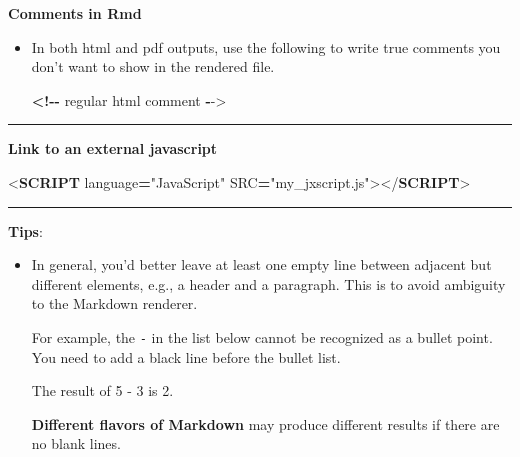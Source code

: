 \documentclass[
  a4paper,
  twoside,
  openright]{book}
\newenvironment{Shaded}{\begin{snugshade}}{\end{snugshade}}
\newcommand{\DataTypeTok}[1]{\textcolor[rgb]{0.13,0.29,0.53}{#1}}
\newcommand{\KeywordTok}[1]{\textcolor[rgb]{0.13,0.29,0.53}{\textbf{#1}}}
\newcommand{\NormalTok}[1]{#1}
\newcommand{\OperatorTok}[1]{\textcolor[rgb]{0.81,0.36,0.00}{\textbf{#1}}}
\newcommand{\OtherTok}[1]{\textcolor[rgb]{0.56,0.35,0.01}{#1}}
\newcommand{\SpecialCharTok}[1]{\textcolor[rgb]{0.81,0.36,0.00}{\textbf{#1}}}
\newcommand{\SpecialStringTok}[1]{\textcolor[rgb]{0.31,0.60,0.02}{#1}}
\newcommand{\StringTok}[1]{\textcolor[rgb]{0.31,0.60,0.02}{#1}}
\theoremstyle{definition}
\theoremstyle{definition}
\theoremstyle{definition}
\theoremstyle{definition}
\theoremstyle{remark}
\begin{document}
\textbf{Comments in Rmd}

\begin{itemize}
\item
  In both html and pdf outputs, use the following to write true comments you don't want to show in the rendered file.

\begin{Shaded}
\begin{Highlighting}[]
\SpecialCharTok{\textless{}!{-}{-}}\NormalTok{ regular html comment }\SpecialCharTok{{-}}\OtherTok{{-}\textgreater{}} 
\end{Highlighting}
\end{Shaded}
\end{itemize}

\begin{center}\rule{0.5\linewidth}{0.5pt}\end{center}

\textbf{Link to an external javascript}

\begin{Shaded}
\begin{Highlighting}[]
\DataTypeTok{\textless{}}\KeywordTok{SCRIPT}\OtherTok{ language}\OperatorTok{=}\StringTok{"JavaScript"}\OtherTok{ SRC}\OperatorTok{=}\StringTok{"my\_jxscript.js"}\DataTypeTok{\textgreater{}\textless{}/}\KeywordTok{SCRIPT}\DataTypeTok{\textgreater{}}
\end{Highlighting}
\end{Shaded}

\begin{center}\rule{0.5\linewidth}{0.5pt}\end{center}

\textbf{Tips}:

\begin{itemize}
\item
  In general, you'd better leave at least one empty line between adjacent but different elements, e.g., a header and a paragraph. This is to avoid ambiguity to the Markdown renderer.

  For example, the \texttt{-} in the list below cannot be recognized as a bullet point. You need to add a black line before the bullet list.

\begin{Shaded}
\begin{Highlighting}[]
\NormalTok{The result of 5}
\SpecialStringTok{{-} }\NormalTok{3 is 2.}
\end{Highlighting}
\end{Shaded}

  \textbf{Different flavors of Markdown} may produce different results if there are no blank lines. 🙈🙈
\end{itemize}
\end{document}
